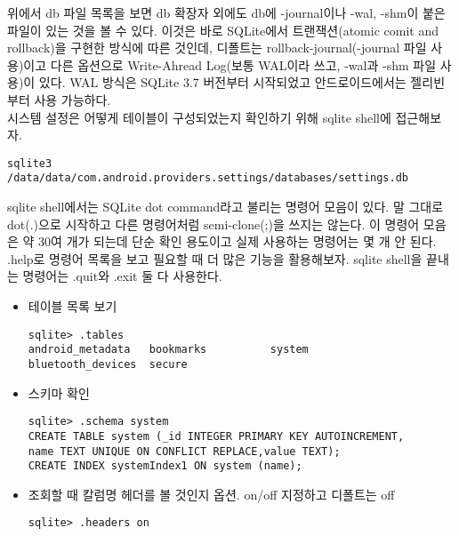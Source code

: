 위에서 db 파일 목록을 보면 db 확장자 외에도 db에 -journal이나 -wal, -shm이 붙은 파일이 있는 것을 볼 수 있다.
이것은 바로 SQLite에서 트랜잭션(atomic comit and rollback)을 구현한 방식에 따른 것인데, 디폴트는 rollback-journal(-journal 파일 사용)이고 다른 옵션으로 Write-Ahread Log(보통 WAL이라 쓰고, -wal과 -shm 파일 사용)이 있다.
WAL 방식은 SQLite 3.7 버전부터 시작되었고 안드로이드에서는 젤리빈부터 사용 가능하다.\\ 

시스템 설정은 어떻게 테이블이 구성되었는지 확인하기 위해 sqlite shell에 접근해보자.
\begin{lstlisting}[frame=single] 
sqlite3 /data/data/com.android.providers.settings/databases/settings.db
\end{lstlisting}

sqlite shell에서는 SQLite dot command라고 불리는 명령어 모음이 있다.
말 그대로 dot(.)으로 시작하고 다른 명령어처럼 semi-clone(;)을 쓰지는 않는다. 이 명령어 모음은 약 30여 개가 되는데 단순 확인 용도이고 실제 사용하는 명령어는 몇 개 안 된다.
.help로 명령어 목록을 보고 필요할 때 더 많은 기능을 활용해보자.
sqlite shell을 끝내는 명령어는 .quit와 .exit 둘 다 사용한다.
\begin{itemize}
\item 테이블 목록 보기
\begin{verbatim}
sqlite> .tables       
android_metadata   bookmarks          system           
bluetooth_devices  secure       
\end{verbatim}
\item 스키마 확인
\begin{verbatim}
sqlite> .schema system
CREATE TABLE system (_id INTEGER PRIMARY KEY AUTOINCREMENT,
name TEXT UNIQUE ON CONFLICT REPLACE,value TEXT);
CREATE INDEX systemIndex1 ON system (name);
\end{verbatim}
\item 조회할 때 칼럼명 헤더를 볼 것인지 옵션. on/off 지정하고 디폴트는 off
\begin{verbatim}
sqlite> .headers on 
\end{verbatim}
\end{itemize}

